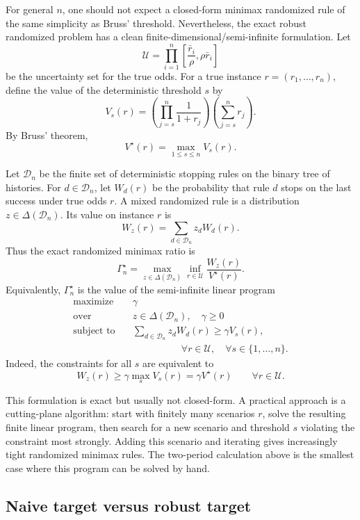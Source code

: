 \documentclass[11pt,a4paper]{article}
\begin{document}
For general \(n\), one should not expect a closed-form minimax randomized rule
of the same simplicity as Bruss' threshold.  Nevertheless, the exact robust
randomized problem has a clean finite-dimensional/semi-infinite formulation.
Let
\[
  \mathcal U
  =
  \prod_{i=1}^n
  \left[\frac{\bar r_i}{\rho},\rho\bar r_i\right]
\]
be the uncertainty set for the true odds.  For a true instance
\(r=(r_1,\dots,r_n)\), define the value of the deterministic threshold \(s\) by
\[
  V_s(r)
  =
  \left(\prod_{j=s}^n\frac1{1+r_j}\right)
  \left(\sum_{j=s}^n r_j\right).
\]
By Bruss' theorem,
\[
  V^\star(r)=\max_{1\le s\le n}V_s(r).
\]

Let \(\mathcal D_n\) be the finite set of deterministic stopping rules on the
binary tree of histories.  For \(d\in\mathcal D_n\), let \(W_d(r)\) be the
probability that rule \(d\) stops on the last success under true odds \(r\).  A
mixed randomized rule is a distribution \(z\in\Delta(\mathcal D_n)\).  Its value
on instance \(r\) is
\[
  W_z(r)=\sum_{d\in\mathcal D_n}z_d W_d(r).
\]
Thus the exact randomized minimax ratio is
\[
  \Gamma_n^\star
  =
  \max_{z\in\Delta(\mathcal D_n)}
  \inf_{r\in\mathcal U}
  \frac{W_z(r)}{V^\star(r)}.
\]
Equivalently, \(\Gamma_n^\star\) is the value of the semi-infinite linear program
\[
\begin{aligned}
  \text{maximize}\quad & \gamma \\
  \text{over}\quad & z\in\Delta(\mathcal D_n),\quad \gamma\ge0 \\
  \text{subject to}\quad
  & \sum_{d\in\mathcal D_n}z_d W_d(r)
    \ge \gamma V_s(r),
    \\
  & \hspace{5em}\forall r\in\mathcal U,
    \quad \forall s\in\{1,\dots,n\}.
\end{aligned}
\]
Indeed, the constraints for all \(s\) are equivalent to
\[
  W_z(r)
  \ge
  \gamma\max_s V_s(r)
  =
  \gamma V^\star(r)
  \qquad
  \forall r\in\mathcal U.
\]

This formulation is exact but usually not closed-form.  A practical approach is
a cutting-plane algorithm: start with finitely many scenarios \(r\), solve the
resulting finite linear program, then search for a new scenario and threshold
\(s\) violating the constraint most strongly.  Adding this scenario and
iterating gives increasingly tight randomized minimax rules.  The two-period
calculation above is the smallest case where this program can be solved by hand.

\subsection{Naive target versus robust target}
\end{document}
